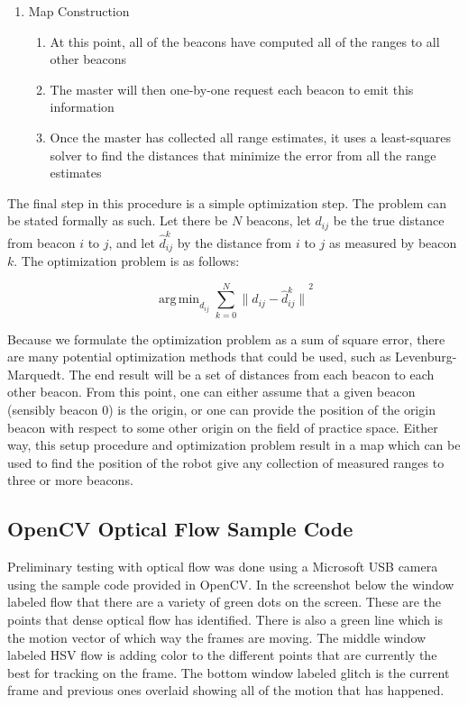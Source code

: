 \documentclass{article}
\DeclareMathOperator*{\argmin}{arg\,min}
\begin{document}
\begin{enumerate}
      \item Map Construction \\
        \begin{enumerate}
          \item At this point, all of the beacons have computed all of the ranges to all other beacons
          \item The master will then one-by-one request each beacon to emit this information
          \item Once the master has collected all range estimates, it uses a least-squares solver to find the distances that minimize the error from all the range estimates
        \end{enumerate}
    \end{enumerate}

    The final step in this procedure is a simple optimization step. The problem can be stated formally as such. Let there be $N$ beacons, let $d_{ij}$ be the true distance from beacon $i$ to $j$, and let $\hat{d}^k_{ij}$ by the distance from $i$ to $j$ as measured by beacon $k$. The optimization problem is as follows:

    \begin{equation} \label{eq:beacon_optimization}
      \argmin_{d_{ij}}\sum_{k=0}^N{\lVert d_{ij}-\hat{d}^k_{ij} \rVert}^2
    \end{equation}

    Because we formulate the optimization problem as a sum of square error, there are many potential optimization methods that could be used, such as Levenburg-Marquedt. The end result will be a set of distances from each beacon to each other beacon. From this point, one can either assume that a given beacon (sensibly beacon 0) is the origin, or one can provide the position of the origin beacon with respect to some other origin on the field of practice space. Either way, this setup procedure and optimization problem result in a map which can be used to find the position of the robot give any collection of measured ranges to three or more beacons.

	\subsection{OpenCV Optical Flow Sample Code}

    Preliminary testing with optical flow was done using a Microsoft USB camera using the sample code provided in OpenCV. In the screenshot below the window labeled flow that there are a variety of green dots on the screen. These are the points that dense optical flow has identified. There is also a green line which is the motion vector of which way the frames are moving. The middle window labeled HSV flow is adding color to the different points that are currently the best for tracking on the frame. The bottom window labeled glitch is the current frame and previous ones overlaid showing all of the motion that has happened.
\end{document}
